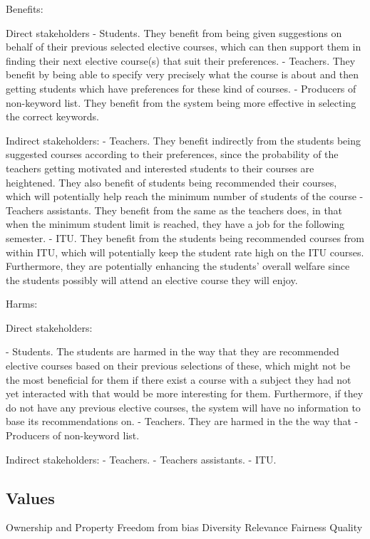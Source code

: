 Benefits:

Direct stakeholders
- Students. They benefit from being given suggestions on behalf of their previous selected elective courses, which can then support them in finding their next elective course(s) that suit their preferences.
- Teachers. They benefit by being able to specify very precisely what the course is about and then getting students which have preferences for these kind of courses.
- Producers of non-keyword list. They benefit from the system being more effective in selecting the correct keywords.

Indirect stakeholders:
- Teachers. They benefit indirectly from the students being suggested courses according to their preferences, since the probability of the teachers getting motivated and interested students to their courses are heightened. They also benefit of students being recommended their courses, which will potentially help reach the minimum number of students of the course
- Teachers assistants. They benefit from the same as the teachers does, in that when the minimum student limit is reached, they have a job for the following semester.
- ITU. They benefit from the students being recommended courses from within ITU, which will potentially keep the student rate high on the ITU courses. Furthermore, they are potentially enhancing the students' overall welfare since the students possibly will attend an elective course they will enjoy.


Harms:

Direct stakeholders:

- Students. The students are harmed in the way that they are recommended elective courses based on their previous selections of these, which might not be the most beneficial for them if there exist a course with a subject they had not yet interacted with that would be more interesting for them.
Furthermore, if they do not have any previous elective courses, the system will have no information to base its recommendations on.
- Teachers. They are harmed in the the way that 
- Producers of non-keyword list. 

Indirect stakeholders:
- Teachers.
- Teachers assistants.
- ITU. 




\subsection{Values}

Ownership and Property
Freedom from bias
Diversity
Relevance
Fairness
Quality


